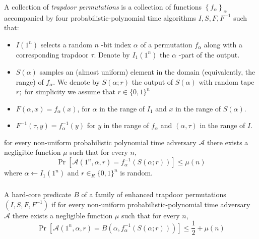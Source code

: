 \documentclass{beamer}
\begin{document}
    \begin{frame}
        \frametitle{}
        \begin{definition}
            A collection of \emph{trapdoor permutations} is a collection of functions $\left\{f_{\alpha}\right\}_{\alpha}$ accompanied by four probabilistic-polynomial time algorithms $I, S, F, F^{-1}$ such that:
            \begin{itemize}
                \item $I\left(1^{n}\right)$ selects a random $n$ -bit index $\alpha$ of a permutation $f_{\alpha}$ along with a corresponding trapdoor $\tau$. Denote by $I_{1}\left(1^{n}\right)$ the $\alpha$ -part of the output.
                \item  $S(\alpha)$ samples an (almost uniform) element in the domain (equivalently, the range) of $f_{\alpha}$. We denote by $S(\alpha ; r)$ the output of $S(\alpha)$ with random tape $r ;$ for simplicity we assume that $r \in\{0,1\}^{n}$
                \item $F(\alpha, x)=f_{\alpha}(x)$, for $\alpha$ in the range of $I_{1}$ and $x$ in the range of $S(\alpha)$.
                \item $F^{-1}(\tau, y)=f_{\alpha}^{-1}(y)$ for $y$ in the range of $f_{\alpha}$ and $(\alpha, \tau)$ in the range of $I$.
            \end{itemize}
            for every non-uniform probabilistic polynomial time adversary $\mathcal{A}$ there exists a negligible function $\mu$ such that for every $n$,
            $$
            \operatorname{Pr}\left[\mathcal{A}\left(1^{n}, \alpha, r\right)=f_{\alpha}^{-1}(S(\alpha ; r))\right] \leq \mu(n)
            $$
            where $\alpha \leftarrow I_{1}\left(1^{n}\right)$ and $r \in_{R}\{0,1\}^{n}$ is random. 
        \end{definition}
    
        
    
    \end{frame}

    \begin{frame}
        \frametitle{}
    
        \begin{definition}
            A hard-core predicate $B$ of a family of enhanced trapdoor permutations $\left(I, S, F, F^{-1}\right)$ if for every non-uniform probabilistic-polynomial time adversary $\mathcal{A}$ there exists a negligible function $\mu$ such that for every $n$,
            $$
            \operatorname{Pr}\left[\mathcal{A}\left(1^{n}, \alpha, r\right)=B\left(\alpha, f_{\alpha}^{-1}(S(\alpha ; r))\right)\right] \leq \frac{1}{2}+\mu(n)
            $$
        \end{definition}
    
    \end{frame}
\end{document}
